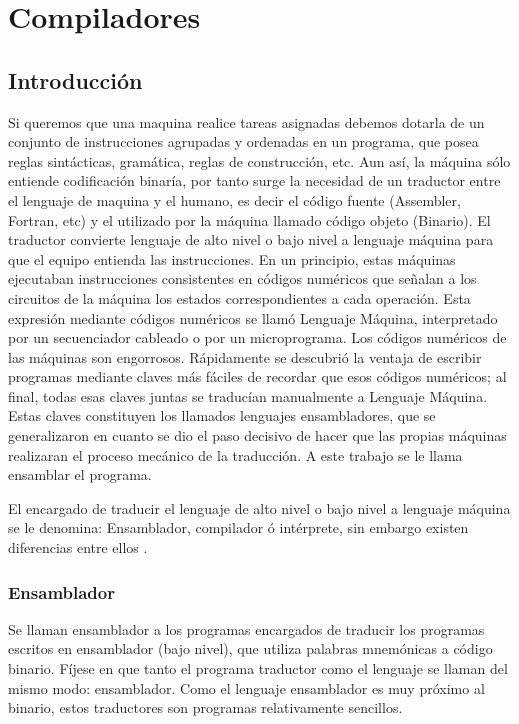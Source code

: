
\chapter{Compiladores}

\section{Introducción}

Si queremos que una maquina realice tareas asignadas debemos dotarla de un conjunto de instrucciones agrupadas y ordenadas en un programa, que posea reglas sintácticas, gramática, reglas de construcción, etc. Aun así, la máquina sólo entiende codificación binaría, por tanto surge la necesidad de un traductor entre el lenguaje de maquina y el humano, es decir el código fuente (Assembler, Fortran, etc) y el utilizado por la máquina llamado código objeto (Binario). El traductor convierte lenguaje de alto nivel o bajo nivel a lenguaje máquina para que el equipo entienda las instrucciones.
En un principio, estas máquinas ejecutaban instrucciones consistentes en códigos numéricos que señalan a los circuitos de la máquina los estados correspondientes a cada operación. Esta expresión mediante códigos numéricos se llamó Lenguaje Máquina, interpretado por un secuenciador cableado o por un microprograma. Los códigos numéricos de las máquinas son engorrosos. Rápidamente se descubrió la ventaja de escribir programas mediante claves más fáciles de recordar que esos códigos numéricos; al final, todas esas claves juntas se traducían manualmente a Lenguaje Máquina. Estas claves constituyen los llamados lenguajes ensambladores, que se generalizaron en cuanto se dio el paso decisivo de hacer que las propias máquinas realizaran el proceso mecánico de la traducción. A este trabajo se le llama ensamblar el programa.

El encargado de traducir el lenguaje de alto nivel o bajo nivel a lenguaje máquina se le denomina: Ensamblador, compilador ó intérprete, sin embargo existen diferencias entre ellos \cite{CompJFMM}.

\subsection{Ensamblador}
                                                      
Se llaman ensamblador a los programas encargados de traducir los programas escritos en ensamblador (bajo nivel), que utiliza palabras mnemónicas a código binario. 
Fíjese en que tanto el programa traductor como el lenguaje se llaman del mismo modo: ensamblador.
Como el lenguaje ensamblador es muy próximo al binario, estos traductores son programas relativamente sencillos.


